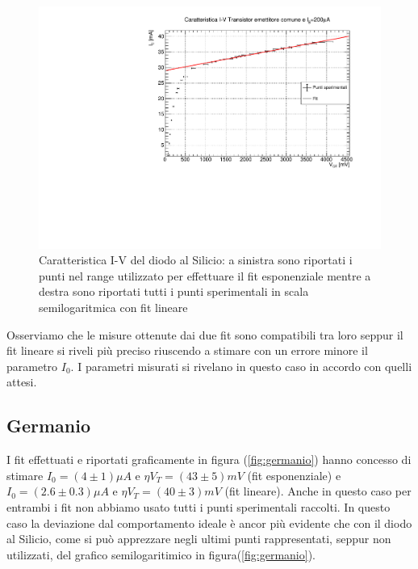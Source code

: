 \documentclass[]{article}
\begin{document}
	\begin{figure}[H]
		\centering
		\includegraphics[width=0.9\linewidth]{../200 muA/c1}
		\caption{Caratteristica I-V del diodo al Silicio: a sinistra sono riportati i punti nel range utilizzato per effettuare il fit esponenziale mentre a destra sono riportati tutti i punti sperimentali in scala semilogaritmica con fit lineare}
		\label{fig:silicio}
	\end{figure}

Osserviamo che le misure ottenute dai due fit sono compatibili tra loro seppur il fit lineare si riveli più preciso riuscendo a stimare con un errore minore il parametro $I_0$.
I parametri misurati si rivelano in questo caso in accordo con quelli attesi.
\subsection{Germanio}
I fit effettuati e riportati graficamente in figura (\ref{fig:germanio}) hanno concesso di stimare $I_0=(4\pm1)\mu A$ e $\eta V_T=(43\pm5)mV$ (fit esponenziale) e $I_0=(2.6\pm0.3)\mu A$ e $\eta V_T=(40\pm3)mV$ (fit lineare). Anche in questo caso per entrambi i fit non abbiamo usato tutti i punti sperimentali raccolti. In questo caso la deviazione dal comportamento ideale è ancor più evidente che con il diodo al Silicio, come si può apprezzare negli ultimi punti rappresentati, seppur non utilizzati, del grafico semilogaritimico in figura(\ref{fig:germanio}).
\end{document}
